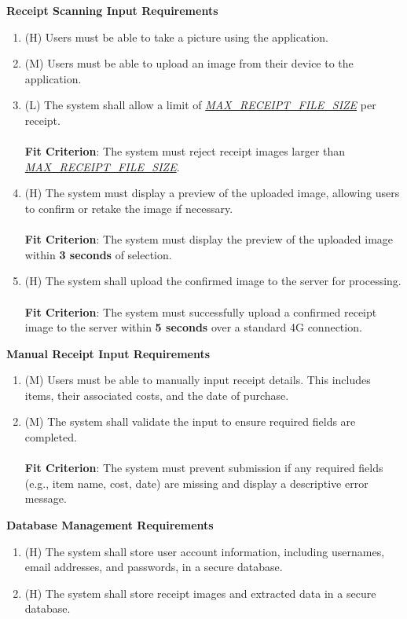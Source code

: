 \documentclass[12pt]{article}
\begin{document}
\textbf{Receipt Scanning Input Requirements}\label{FR-IP}
\begin{enumerate}[label=FR-IP-\arabic*]
  \item (H) Users must be able to take a picture using the application.
  \item (M) Users must be able to upload an image from their device to the
  application.
  \item (L) The system shall allow a limit of \hyperref[Table:AuxConstants]{\textit{MAX\_RECEIPT\_FILE\_SIZE}} per receipt.
  \\ \\ \textbf{Fit Criterion}: The system must reject receipt images larger than \hyperref[Table:AuxConstants]{\textit{MAX\_RECEIPT\_FILE\_SIZE}}.
  \item (H) The system must display a preview of the uploaded image, allowing users
  to confirm or retake the image if necessary. 
  \\ \\ \textbf{Fit Criterion}: The system must display the preview of the uploaded image within \textbf{3 seconds} of selection.
  \item (H) The system shall upload the confirmed image to the server for processing.
  \\ \\ \textbf{Fit Criterion}: The system must successfully upload a confirmed receipt image to the server within \textbf{5 seconds} over a standard 4G connection.
\end{enumerate}

\textbf{Manual Receipt Input Requirements}\label{FR-MIS}
\begin{enumerate}[label=FR-MIS-\arabic*]
  \item (M) Users must be able to manually input receipt details. This includes
  items, their associated costs, and the date of purchase.
  \item (M) The system shall validate the input to ensure required fields are
  completed.
  \\ \\ \textbf{Fit Criterion}: The system must prevent submission if any required fields (e.g., item name, cost, date) are missing and display a descriptive error message.
  \end{enumerate}

\textbf{Database Management Requirements}\label{FR-DM}
\begin{enumerate}[label=FR-DM-\arabic*]
  \item (H) The system shall store user account information, including usernames,
  email addresses, and passwords, in a secure database.
  \item (H) The system shall store receipt images and extracted data in a secure database.
\end{enumerate}
\end{document}
